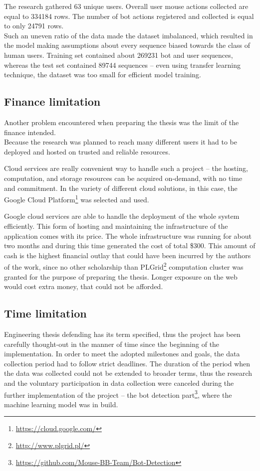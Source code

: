 The research gathered \num{63} unique users.
Overall user mouse actions collected are equal to \num{334184} rows.
The number of bot actions registered and collected is equal to only \num{24791} rows.\\
Such an uneven ratio of the data made the dataset imbalanced, which resulted in the model making assumptions about every sequence biased towards the class of human users.
Training set contained about \num{269231} bot and user sequences, whereas the test set contained \num{89744} sequences – even using transfer learning technique, the dataset was too small for efficient model training.

\subsection{Finance limitation}\label{subsec:finance-limitation}
Another problem encountered when preparing the thesis was the limit of the finance intended.\\
Because the research was planned to reach many different users it had to be deployed and hosted on trusted and reliable resources.

Cloud services are really convenient way to handle such a project – the hosting, computation, and storage resources can be acquired on-demand, with no time and commitment.
In the variety of different cloud solutions, in this case, the Google Cloud Platform\footnote{\url{https://cloud.google.com/}} was selected and used.

Google cloud services are able to handle the deployment of the whole system efficiently.
This form of hosting and maintaining the infrastructure of the application comes with its price.
The whole infrastructure was running for about two months and during this time generated the cost of total \$\num{300}.
This amount of cash is the highest financial outlay that could have been incurred by the authors of the work, since no other scholarship than PLGrid\footnote{\url{http://www.plgrid.pl/}} computation cluster was granted for the purpose of preparing the thesis.
Longer exposure on the web would cost extra money, that could not be afforded.

\subsection{Time limitation}\label{subsec:time-limitation}
Engineering thesis defending has its term specified, thus the project has been carefully thought-out in the manner of time since the beginning of the implementation.
In order to meet the adopted milestones and goals, the data collection period had to follow strict deadlines.
The duration of the period when the data was collected could not be extended to broader terms, thus the research and the voluntary participation in data collection were canceled during the further implementation of the project – the bot detection part\footnote{\url{https://github.com/Mouse-BB-Team/Bot-Detection}}, where the machine learning model was in build.


